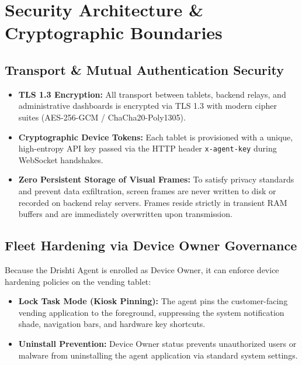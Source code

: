 \documentclass[11pt,a4paper]{article}
\begin{document}
\section{Security Architecture \& Cryptographic Boundaries}

\subsection{Transport \& Mutual Authentication Security}
\begin{itemize}[leftmargin=*]
    \item \textbf{TLS 1.3 Encryption:} All transport between tablets, backend relays, and administrative dashboards is encrypted via TLS 1.3 with modern cipher suites (AES-256-GCM / ChaCha20-Poly1305).
    \item \textbf{Cryptographic Device Tokens:} Each tablet is provisioned with a unique, high-entropy API key passed via the HTTP header \texttt{x-agent-key} during WebSocket handshakes.
    \item \textbf{Zero Persistent Storage of Visual Frames:} To satisfy privacy standards and prevent data exfiltration, screen frames are never written to disk or recorded on backend relay servers. Frames reside strictly in transient RAM buffers and are immediately overwritten upon transmission.
\end{itemize}

\subsection{Fleet Hardening via Device Owner Governance}
Because the Drishti Agent is enrolled as Device Owner, it can enforce device hardening policies on the vending tablet:
\begin{itemize}[leftmargin=*]
    \item \textbf{Lock Task Mode (Kiosk Pinning):} The agent pins the customer-facing vending application to the foreground, suppressing the system notification shade, navigation bars, and hardware key shortcuts.
    \item \textbf{Uninstall Prevention:} Device Owner status prevents unauthorized users or malware from uninstalling the agent application via standard system settings.
\end{itemize}

\end{document}
